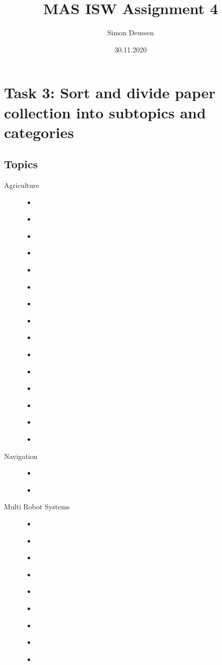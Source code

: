 \documentclass{article}
\title{MAS ISW Assignment 4}
\date{30.11.2020}
\author{Simon Deussen}
\begin{document}
  \maketitle

  \section*{Task 3: Sort and divide paper collection into subtopics and categories}

  \subsection*{Topics}  
  \begin{description}
    \item[Agriculture]
    \begin{itemize}
      \item \cite{Ball2015}
      \item \cite{Gao2018}
      \item \cite{Bechar2016}
      \item \cite{Tiwari2020}
      \item \cite{Ge2020}
      \item \cite{Fu2020}
      \item \cite{Chen2020}
      \item \cite{Raja2020}
      \item \cite{Herck2020}
      \item \cite{VillaHenriksen2020}
      \item \cite{Oberti2016}
      \item \cite{Pedersen2006}
      \item \cite{Weiss2011}
      \item \cite{Vasconez2019}
      \item \cite{Jones2019}
        \end{itemize}

    \item[Navigation]
    \begin{itemize}
     
      \item \cite{Huang2020}
      \item \cite{}
        \end{itemize}
    \item[Multi Robot Systems]  
    \begin{itemize}
      \item \cite{Schneider2003}
      \item \cite{Liang2014}
      \item \cite{Liu2006}
      \item \cite{Roldan2016}
      \item \cite{Gao2018}
      \item \cite{Hameed2018}
      \item \cite{CORTES2017}
      \item \cite{Wu2019}
      \item \cite{Wang2020a}
   

\end{itemize}
\end{description}
\end{document}
